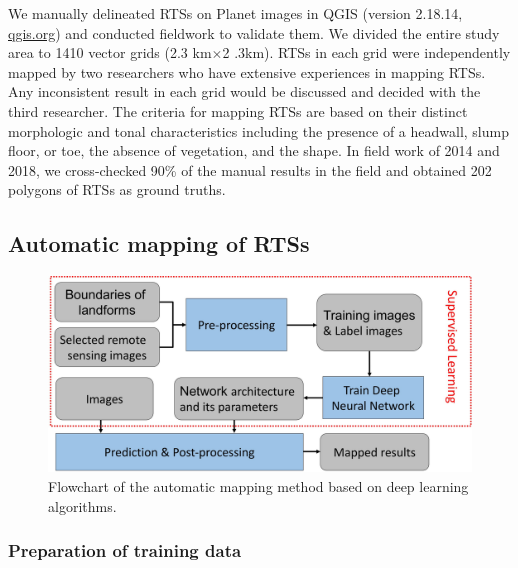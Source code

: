 \documentclass[preprint,12pt,authoryear]{elsarticle}
\begin{document}
We manually delineated RTSs on Planet images in QGIS (version 2.18.14, \url{qgis.org}) and conducted fieldwork to validate them. We divided the entire study area to 1410 vector grids (2.3 km$\times$2 .3km). RTSs in each grid were independently mapped by two researchers who have extensive experiences in mapping RTSs. Any inconsistent result in each grid would be discussed and decided with the third researcher. The criteria for mapping RTSs are based on their distinct morphologic and tonal characteristics including the presence of a headwall, slump floor, or toe, the absence of vegetation, and the shape. In field work of 2014 and 2018, we cross-checked 90\% of the manual results in the field and obtained 202 polygons of RTSs as ground truths.     

\subsection{Automatic mapping of RTSs}
\label{subsec_auto_mapping}

\begin{figure}[ht]
	\centering
	\includegraphics[width=12cm]{figures/flowchart_trim.jpg}
	\caption{Flowchart of the automatic mapping method based on deep learning algorithms.}
	\label{fig_flowchart}
\end{figure}

\subsubsection{Preparation of training data}
\label{subsubsec_pre_trainingdata}
\end{document}
